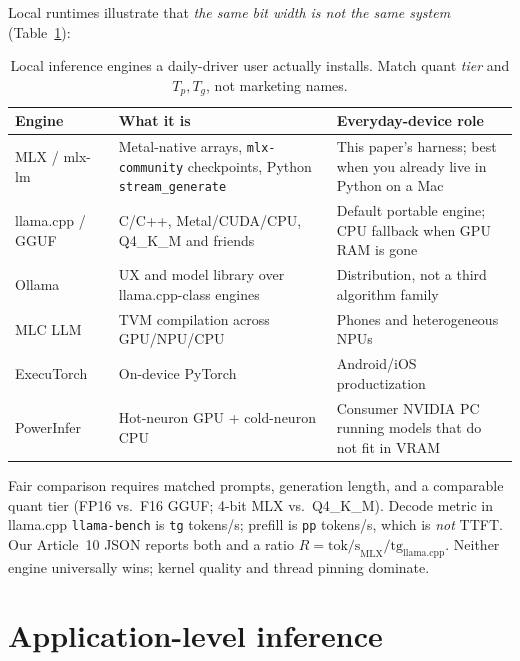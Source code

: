 Local runtimes illustrate that \emph{the same bit width is not the same system} (Table~\ref{tab:runtimes}):

\begin{table}[t]
  \centering
  \small
  \caption{Local inference engines a daily-driver user actually installs. Match quant \emph{tier} and \(T_p,T_g\), not marketing names.}
  \label{tab:runtimes}
  \begin{tabularx}{\textwidth}{@{}>{\raggedright\arraybackslash}p{2.4cm}X>{\raggedright\arraybackslash}p{2.8cm}@{}}
    \toprule
    Engine & What it is & Everyday-device role \\
    \midrule
    MLX / mlx-lm~\citep{mlx2023,mlxlm2023} & Metal-native arrays, \texttt{mlx-community} checkpoints, Python \texttt{stream\_generate} & This paper's harness; best when you already live in Python on a Mac \\
    llama.cpp / GGUF~\citep{llamacpp,gguf} & C/C++, Metal/CUDA/CPU, Q4\_K\_M and friends & Default portable engine; CPU fallback when GPU RAM is gone \\
    Ollama~\citep{ollama} & UX and model library over llama.cpp-class engines & Distribution, not a third algorithm family \\
    MLC LLM~\citep{mlcllm} & TVM compilation across GPU/NPU/CPU & Phones and heterogeneous NPUs \\
    ExecuTorch~\citep{executorch} & On-device PyTorch & Android/iOS productization \\
    PowerInfer~\citep{song2024powerinfer} & Hot-neuron GPU + cold-neuron CPU & Consumer NVIDIA PC running models that do not fit in VRAM \\
    \bottomrule
  \end{tabularx}
\end{table}

Fair comparison requires matched prompts, generation length, and a comparable quant tier (FP16 vs.\ F16 GGUF; 4-bit MLX vs.\ Q4\_K\_M). Decode metric in llama.cpp \texttt{llama-bench} is \texttt{tg} tokens/s; prefill is \texttt{pp} tokens/s, which is \emph{not} TTFT. Our Article~10 JSON reports both and a ratio \(R = \mathrm{tok/s}_{\mathrm{MLX}} / \mathrm{tg}_{\mathrm{llama.cpp}}\). Neither engine universally wins; kernel quality and thread pinning dominate.

\section{Application-level inference}
\label{sec:app}

